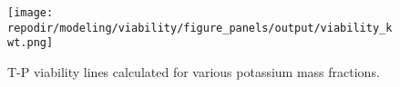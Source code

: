 \begin{figure}[h]
    \centering
    \texttt{[image: \\repodir/modeling/viability/figure\_panels/output/viability\_kwt.png]} 
    \caption{T-P viability lines calculated for various potassium mass fractions. }
    \label{fig:SI_P_zero_kwt}
\end{figure}





